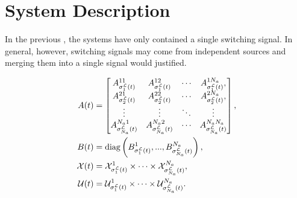 
\section{System Description}
In the previous , the systems have only contained a single switching signal. In general, however, switching signals may come from independent sources and merging them into a single signal would  justified. 

\begin{subequations}
\label{eq:sys}
\begin{align}
A(t)&=\begin{bmatrix}
A^{11}_{\ssl[1](t)}&A^{12}_{\ssl[1](t)}&\cdots&A^{1\numagents}_{\ssl[1](t)},\\
A^{21}_{\ssl[2](t)}&A^{22}_{\ssl[2](t)}&\cdots&A^{2\numagents}_{\ssl[2](t)},\\
\vdots&\vdots & \ddots & \vdots\\
A^{\numagents 1}_{\ssl[\numagents](t)} & A^{\numagents 2}_{\ssl[\numagents](t)} &\cdots & A^{\numagents \numagents}_{\ssl[\numagents](t)} 
\end{bmatrix},\label{eq:sys_A}\\
B(t)&=\text{diag}\left(
B^{1}_{\ssl[1](t)},...,B^{\numagents}_{\ssl[\numagents](t)}\right),\label{eq:sys_B}\\
\xcon(t)&=\xcon[\ssl[1](t)]^1\times\cdots\times\xcon[\ssl[\numagents](t)]^\numagents,\label{eq:sys_X}\\
\ucon(t)&=\ucon[\ssl[1](t)]^1\times\cdots\times\ucon[\ssl[\numagents](t)]^\numagents\label{eq:sys_Y}.
\end{align}
\end{subequations}
